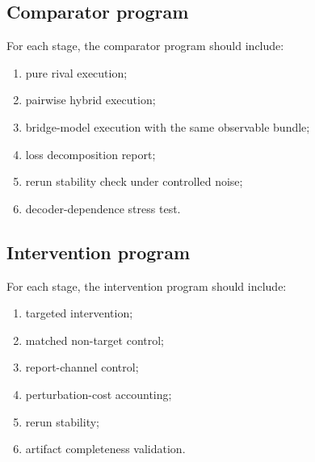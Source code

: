 \documentclass[11pt,a4paper]{article}
\theoremstyle{definition}
\begin{document}
\subsection{Comparator program}
For each stage, the comparator program should include:
\begin{enumerate}[leftmargin=1.5em]
\item pure rival execution;
\item pairwise hybrid execution;
\item bridge-model execution with the same observable bundle;
\item loss decomposition report;
\item rerun stability check under controlled noise;
\item decoder-dependence stress test.
\end{enumerate}

\subsection{Intervention program}
For each stage, the intervention program should include:
\begin{enumerate}[leftmargin=1.5em]
\item targeted intervention;
\item matched non-target control;
\item report-channel control;
\item perturbation-cost accounting;
\item rerun stability;
\item artifact completeness validation.
\end{enumerate}
\end{document}
